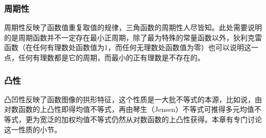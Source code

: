 \subsubsection{周期性}
\label{sec:periodicity-of-function}

周期性反映了函数值重复取值的规律，三角函数的周期性人尽皆知。此处需要说明的是周期函数并不一定存在最小正周期，除了最为特殊的常量函数以外，狄利克雷函数（在任何有理数处函数值为1，而任何无理数处函数值为零）也可以说明这一点，任何有理数都是它的周期，而最小的正有理数是不存在的。

\subsubsection{凸性}
\label{sec:convex-property-of-function}

凸凹性反映了函数图像的拱形特征，这个性质是一大批不等式的本源，比如说，由对数函数的上凸性即得均值不等式，再由琴生（Jensen）不等式可推得多元均值不等式，更为宽泛的加权均值不等式仍然从对数函数的上凸性获得。本章有专门讨论这一性质的小节。

